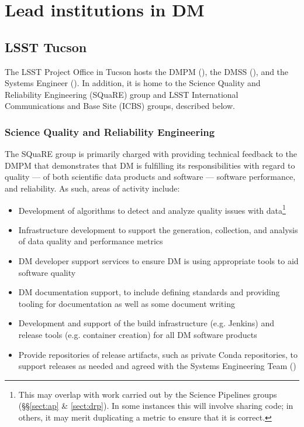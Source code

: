 \section{Lead institutions in \gls{DM} \label{sect:leadtutes}}

\subsection{LSST Tucson\label{sect:tucson}}

The \gls{LSST} Project Office in Tucson hosts the \gls{DMPM} (), the \gls{DMSS} (), and the \gls{Systems Engineer} ().
In addition, it is home to the Science Quality and Reliability Engineering (\gls{SQuaRE}) group and \gls{LSST} International Communications and Base Site (\gls{ICBS}) groups, described below.

\subsubsection{Science Quality and Reliability Engineering \label{sect:square}}

The \gls{SQuaRE} group is primarily charged with providing technical feedback to the \gls{DMPM} that demonstrates that \gls{DM} is fulfilling its responsibilities with regard to quality — of both scientific data products and software — software performance, and reliability. As such, areas of activity include:

\begin{itemize}

\item Development of algorithms to detect and analyze quality issues with data\footnote{This may overlap with work carried out by the \gls{Science Pipelines} groups (\S\S\ref{sect:ap} \& \ref{sect:drp}). In some instances this will involve sharing code; in others, it may merit duplicating a \gls{metric} to ensure that it is correct.}

\item Infrastructure development to support the generation, collection, and analysis of data quality and performance metrics

\item \gls{DM} developer support services to ensure \gls{DM} is using appropriate tools to aid software quality

\item \gls{DM} documentation support, to include defining standards and providing tooling for documentation as well as some document writing

\item Development and support of the build infrastructure (e.g. Jenkins) and release tools (e.g. container creation) for all \gls{DM} software products

\item Provide repositories of release artifacts, such as private Conda repositories, to support releases as needed and agreed with the Systems Engineering Team ()

\end{itemize}

